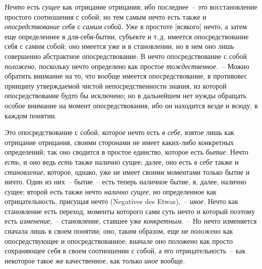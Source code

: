 \emph{Нечто} есть \emph{сущее} как отрицание отрицания; ибо последнее~--
это восстановление простого соотношения с собой;
но тем самым нечто есть также и \emph{опосредствование
себя} с \emph{самим собой}. Уже в простоте [всякого] нечто, а
затем еще определеннее в для-себя-бытии, субъекте
и т.\,д. имеется опосредствование себя с самим собой; оно
имеется уже и в становлении, но в нем оно лишь совершенно
абстрактное опосредствование. В нечто опосредствование
с собой \emph{положено}, поскольку нечто определено
как простое \emph{тождественное}.~-- Можно обратить внимание
на то, что вообще имеется опосредствование, в противовес
принципу утверждаемой чистой непосредственности
знания, из которой опосредствование будто бы исключено;
но в дальнейшем нет нужды обращать особое внимание
на момент опосредствования, ибо он находится везде
и всюду, в каждом понятии.

Это опосредствование с собой, которое нечто есть \emph{в
себе}, взятое лишь как отрицание отрицания, своими сторонами
не имеет каких-либо конкретных определений;
так оно сводится в простое единство, которое есть \emph{бытие}.
Нечто \emph{есть}, и оно ведь \emph{есть} также налично сущее; далее,
оно есть \emph{в себе} также и \emph{становление}, которое, однако,
уже не имеет своими моментами только бытие и ничто.
Один из них~-- бытие~-- есть теперь наличное бытие, я,
далее, налично сущее; второй есть также нечто \emph{налично
сущее}, но определенное как отрицательность, присущая
нечто (Negatives des Etwas),~-- \emph{иное}. Нечто как становление
есть переход, моменты которого сами суть нечто и
который поэтому есть \emph{изменение},~-- становление, ставшее
уже \emph{конкретным}.~-- Но нечто изменяется сначала лишь
в своем понятии; оно, таким образом, еще не \emph{положено}
как опосредствующее и опосредствованное; вначале оно
положено как просто сохраняющее себя в своем соотношении
с собой, а его отрицательность~-- как некоторое
такое же качественное, как только \emph{иное} вообще.



